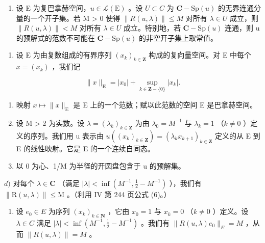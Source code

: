 \begin{enumerate}
\def\labelenumi{\alph{enumi})}
\setcounter{enumi}{1}
\tightlist
\item
  设 E 为复巴拿赫空间，\(u \in \mathcal{L}(\mathrm{E})\) 。设 \(U \subset C\) 为 \(\mathbf{C}-\mathrm{Sp}(u)\) 的无界连通分量的一个开子集。若 M \textgreater{} 0 使得 \(\|R(u, \lambda)\| \leqslant M\) 对所有 \(\lambda \in U\) 成立，则 \(\|R(u, \lambda)\| < M\) 对所有 \(\lambda \in U\) 成立。特别地，若 \(\mathbf{C}-\mathrm{Sp}(u)\) 连通，则 u 的预解式的范数不可能在 \(\mathbf{C}-\mathrm{Sp}(u)\) 的非空开子集上取常值。
\end{enumerate}

\begin{enumerate}
\def\labelenumi{\arabic{enumi})}
\setcounter{enumi}{17}
\tightlist
\item
  设 E 为由复数组成的有界序列 \((x_{k})_{k\in\mathbf{Z}}\) 构成的复向量空间。对 E 中每个 \(x=(x_{k})\) ，我们记
\end{enumerate}

\[
\| x \| _ {\mathrm{E}} = | x _ {0} | + \sup _ {k \in \mathbf {Z} - \{0 \}} | x _ {k} |.
\]

\begin{enumerate}
\def\labelenumi{\alph{enumi})}
\item
  映射 \(x \mapsto \|x\|_{\mathrm{E}}\) 是 E 上的一个范数；赋以此范数的空间 E 是巴拿赫空间。
\item
  设 M \textgreater{} 2 为实数。设 \(\lambda = (\lambda_k)_{k \in \mathbf{Z}}\) 为由 \(\lambda_0 = M^{-1}\) 与 \(\lambda_k = 1\) （\(k \neq 0\) ）定义的序列。我们用 u 表示由 \(u((x_k)_{k \in \mathbf{Z}}) = (\lambda_k x_{k+1})_{k \in \mathbf{Z}}\) 定义的从 E 到 E 的线性映射。它是 E 的一个连续自同态。
\item
  以 0 为心、1/M 为半径的开圆盘包含于 u 的预解集。
\end{enumerate}

\(d)\) 对每个 \(\lambda\in\mathbf{C}\) （满足 \(|\lambda|<\inf(M^{-1},\frac{1}{2}-M^{-1})\) ），我们有 \(\|\mathrm{R}(u,\lambda)\|\leqslant\mathrm{M}\) 。（利用 IV 第 244 页公式 (6)。）

\begin{enumerate}
\def\labelenumi{\alph{enumi})}
\setcounter{enumi}{4}
\tightlist
\item
  设 \(e_{0} \in E\) 为序列 \((x_{k})_{k \in \mathbf{N}}\) ，它由 \(x_{0} = 1\) 与 \(x_{k} = 0\) （\(k \neq 0\) ）定义。设 \(\lambda \in C\) 满足 \(|\lambda| < \inf(M^{-1}, \frac{1}{2} - M^{-1})\) 。我们有 \(\|R(u, \lambda)e_{0}\|_{E} = M\) ，从而 \(\|R(u, \lambda)\| = M\) 。
\end{enumerate}

